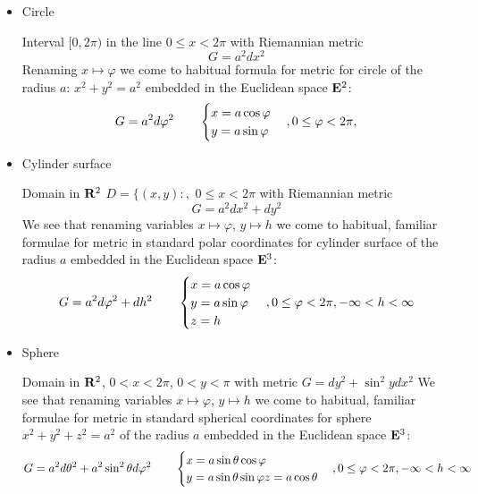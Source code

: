 \documentclass[12pt]{article}
\theoremstyle{theorem}
\numberwithin{equation}{section}
\begin{document}
\begin{itemize}
    \item   Circle

     Interval $[0,2\pi)$ in the line $0\leq x< 2\pi$ with Riemannian  metric
           \begin{equation}\label{circle1}
          G=  a^2dx^2
           \end{equation}
Renaming $x\mapsto \varphi $ we come to habitual formula for
metric
for circle of the radius $a$: $x^2+y^2=a^2$ embedded in the Euclidean space ${\bf E}^2$:
           \begin{equation}\label{circle2}
          G= a^2d\varphi^2\qquad
          \begin{cases}
          x=a\cos\varphi\cr
          y=a\sin\varphi
          \end {cases},
          0\leq \varphi <2\pi,
           \end{equation}




    \item Cylinder surface

     Domain in ${\bf R}^2$ $D=\{(x,y)\colon,\,\, 0\leq x< 2\pi$ with Riemannian  metric
           \begin{equation}\label{domainascylinder1}
          G=  a^2dx^2+dy^2
           \end{equation}
We see that renaming variables $x\mapsto \varphi $, $y\mapsto h$ we come to habitual, familiar formulae for
metric in standard polar coordinates
for cylinder surface of the radius $a$ embedded in the Euclidean space ${\bf E}^3$:
           \begin{equation}\label{domainascylinder2}
          G= a^2d\varphi^2+dh^2\qquad
          \begin{cases}
          x=a\cos\varphi\cr
          y=a\sin\varphi\cr
          z=h\cr
          \end {cases},
          0\leq \varphi <2\pi, -\infty<h<\infty
           \end{equation}


 \item  Sphere

   Domain in ${\bf R}^2$,  $0<x<2\pi$, $0<y<\pi$ with metric $G=dy^2+\sin^2 y dx^2$
We see that renaming variables $x\mapsto \varphi $, $y\mapsto h$ we come to habitual, familiar formulae for
metric in standard spherical coordinates
for sphere $x^2+y^2+z^2=a^2$ of the radius $a$ embedded in the Euclidean space ${\bf E}^3$:
           \begin{equation}\label{domainascylinder2}
          G= a^2d\theta^2+a^2\sin^2\theta
          d\varphi^2\qquad
          \begin{cases}
          x=a\sin\theta\cos\varphi\cr
          y=a\sin\theta\sin\varphi
          z=a\cos\theta
          \end {cases},
          0\leq \varphi <2\pi, -\infty<h<\infty
           \end{equation}


\end{itemize}
\end{document}
